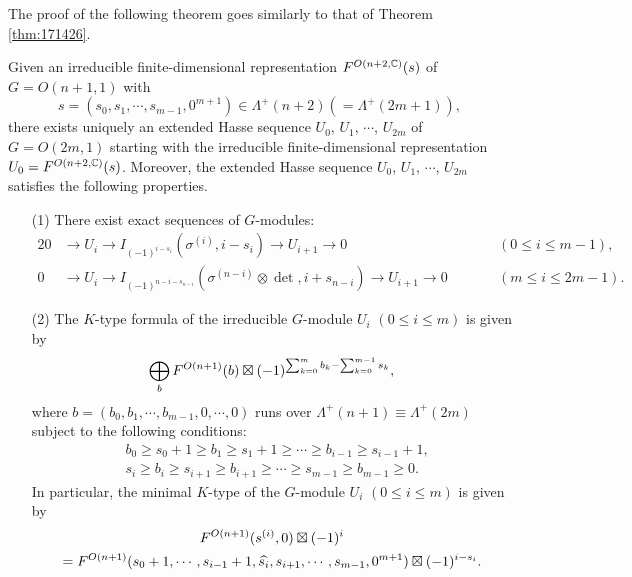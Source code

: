 The proof of the following theorem goes similarly to that of Theorem \ref{thm:171426}.  
\begin{theorem}
[$n=2m-1$]
\label{thm:171425}
Given an irreducible finite-dimensional representation
 $F^{{O(n+2,{\mathbb{C}})}}({s})$
 of $G=O(n+1,1)$ with 
\[
s=(s_{0},s_1,\cdots,s_{m-1},0^{m+1}) \in \Lambda^+(n+2)
 (=\Lambda^+(2m+1)), 
\]
 there exists uniquely an extended 
Hasse sequence $U_0$, $U_1$, $\cdots$, $U_{2m}$
 of $G=O(2m,1)$
 starting with the irreducible finite-dimensional representation
 $U_0=F^{{O(n+2,{\mathbb{C}})}}({s})$.  
Moreover, 
 the extended Hasse sequence $U_0$, $U_1$, $\cdots$, $U_{2m}$
 satisfies the following properties.  
\begin{enumerate}
\item[{\rm{(1)}}]
There exist exact sequences of $G$-modules:
\begin{alignat*}{2}
0 &\to U_i \to I_{(-1)^{i-s_i}}(\sigma^{(i)}, i-s_i)
   \to U_{i+1} \to 0
\qquad
&&(0 \le i \le m-1), 
\\
0 & \to U_i \to I_{(-1)^{n-i-s_{n-i}}}(\sigma^{(n-i)} \otimes \det, i+s_{n-i})
  \to U_{i+1} \to 0
\qquad
&&(m\le i \le 2m-1).  
\end{alignat*}

\item[{\rm{(2)}}]
The $K$-type formula of the irreducible $G$-module $U_i$
 $(0 \le i \le m)$ is given by
\[
  \bigoplus_b F^{{O(n+1)}}({b}) 
  \boxtimes 
  (-1)^{\sum_{k=0}^{m} b_k - \sum_{k=0}^{m-1}s_k}, 
\]
where $b=(b_0, b_1, \cdots, b_{m-1},0,\cdots,0)$
 runs over $\Lambda^+(n+1)\equiv \Lambda^+(2m)$
 subject to the following conditions:
\begin{align*}
& b_{0} \ge s_{0}+1 \ge b_{1} 
  \ge s_{1}+1 \ge \cdots \ge b_{i-1} \ge s_{i-1}+1, 
\\
& s_{i}\ge b_{i} \ge s_{i+1} \ge b_{i+1} \ge \cdots \ge s_{m-1}\ge b_{m-1}\ge 0.
\end{align*}
In particular,
 the minimal $K$-type of the $G$-module $U_i$ $(0 \le i \le m)$ is given by 
\begin{multline*}
  F^{{O(n+1)}}({s^{(i)},0}) \boxtimes (-1)^i
\\
  =
  F^{{O(n+1)}}({s_0+1, \cdots, s_{i-1}+1, \widehat{s_i}, 
s_{i+1}, \cdots, s_{m-1}, 0^{m+1}}) \boxtimes (-1)^{i-s_i}.  
\end{multline*}
\end{enumerate}
\end{theorem}

